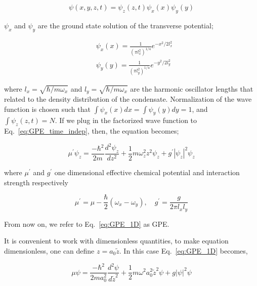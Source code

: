 \documentclass[a4paper,times,12pt]{article}
\begin{document}
\begin{equation}
\label{eq:GPE_time_indep_wave_func_seperated}
\psi(x, y, z, t) = \psi_z(z, t)\psi_x(x)\psi_y(y)
\end{equation}

\noindent $\psi_x$ and $\psi_y$ are the ground state solution of the transverse potential;

\begin{equation}
\begin{split}
\label{eq:GPE_x_y_wave}
& \psi_x(x) = \frac{1}{{(\pi l_x^2)}^{1/4}}e^{-x^2/2l_x^2} \\
& \psi_y(y) = \frac{1}{{(\pi l_y^2)}^{1/4}}e^{-y^2/2l_y^2}
\end{split}
\end{equation}

\noindent where $l_x = \sqrt{\hbar/m\omega_x}$ and $l_y = \sqrt{\hbar/m\omega_x}$ are the harmonic oscillator lengths that related to the density distribution of the condensate. Normalization of the wave function is chosen such that $\int \psi_x(x)dx = \int \psi_y(y)dy = 1$, and $\int \psi_z(z, t) = N$. If we plug in the factorized wave function to Eq.~\eqref{eq:GPE_time_indep}, then, the equation becomes;

\begin{equation}
\label{eq:GPE_1D}
\mu^{\prime}\psi_z = \frac{-\hbar^2}{2m}\frac{d^2\psi_z}{dz^2} + \frac{1}{2}m\omega_z^2 z^2\psi_z + g^{\prime}|\psi_z|^2\psi_z 
\end{equation}

\noindent where $\mu^{\prime}$ and $g^{\prime}$ one dimensional effective chemical potential and interaction strength respectively

\begin{equation}
\label{eq:GPE_1D_chem_inter}
\mu^{\prime} = \mu - \frac{\hbar}{2}(\omega_x - \omega_y), \quad g^{\prime} = \frac{g}{2\pi l_x l_y}
\end{equation}

\noindent From now on, we refer to Eq.~\eqref{eq:GPE_1D} as GPE.

It is convenient to work with dimensionless quantities, to make equation dimensionless, one can define $z = a_0\widetilde{z}$. In this case Eq.~\eqref{eq:GPE_1D} becomes,

\begin{equation}
\label{eq:GPE_dimensionless_length}
\mu\psi = \frac{-\hbar^2}{2ma_0^2}\frac{d^2\psi}{d\widetilde{z}^2} + \frac{1}{2}m\omega^2 a_0^2 \widetilde{z}^2\psi + g|\psi|^2\psi
\end{equation}
\end{document}

